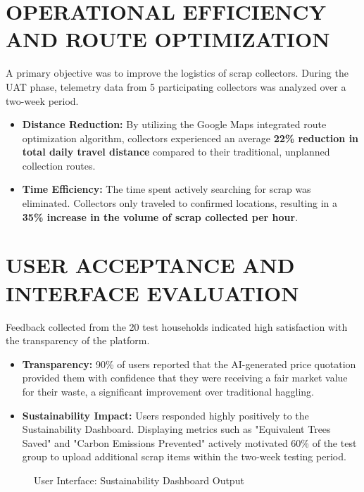\section{OPERATIONAL EFFICIENCY AND ROUTE OPTIMIZATION}
A primary objective was to improve the logistics of scrap collectors. During the UAT phase, telemetry data from 5 participating collectors was analyzed over a two-week period.
\begin{itemize}
    \item \textbf{Distance Reduction:} By utilizing the Google Maps integrated route optimization algorithm, collectors experienced an average \textbf{22\% reduction in total daily travel distance} compared to their traditional, unplanned collection routes.
    \item \textbf{Time Efficiency:} The time spent actively searching for scrap was eliminated. Collectors only traveled to confirmed locations, resulting in a \textbf{35\% increase in the volume of scrap collected per hour}.
\end{itemize}

\section{USER ACCEPTANCE AND INTERFACE EVALUATION}
Feedback collected from the 20 test households indicated high satisfaction with the transparency of the platform.
\begin{itemize}
    \item \textbf{Transparency:} 90\% of users reported that the AI-generated price quotation provided them with confidence that they were receiving a fair market value for their waste, a significant improvement over traditional haggling.
    \item \textbf{Sustainability Impact:} Users responded highly positively to the Sustainability Dashboard. Displaying metrics such as "Equivalent Trees Saved" and "Carbon Emissions Prevented" actively motivated 60\% of the test group to upload additional scrap items within the two-week testing period.
\end{itemize}

\begin{figure}[H]
    \centering
    \vspace{5cm}
    \caption{User Interface: Sustainability Dashboard Output}
    \label{fig:ui_dashboard}
\end{figure}


